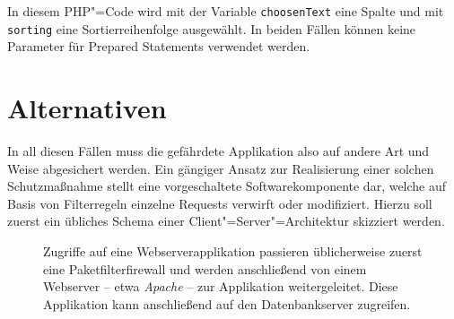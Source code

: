 \begin{listing}[htbp!]
\begin{margincap}
\inputminted[startinline,obeytabs]{php}{imports/weak_features.php}
\caption[Dynamische Auswahl von Spalten und Sortierung]{In diesem PHP"=Code wird mit der Variable \texttt{choosenText} eine Spalte und mit \texttt{sorting} eine Sortierreihenfolge ausgewählt. In beiden Fällen können keine Parameter für Prepared Statements verwendet werden.}
\label{lst:strange_query}
\end{margincap}
\end{listing}



\section{Alternativen}
In all diesen Fällen muss die gefährdete Applikation also auf andere Art und Weise abgesichert werden. Ein gängiger Ansatz zur Realisierung einer solchen Schutzmaßnahme stellt eine vorgeschaltete Softwarekomponente dar, welche auf Basis von Filterregeln einzelne Requests verwirft oder modifiziert. Hierzu soll zuerst ein übliches Schema einer Client"=Server"=Architektur skizziert werden.

\begin{figure}[ht!]
\begin{margincap}
\centering
{}
\caption[Webserverarchitektur]{Zugriffe auf eine Webserverapplikation passieren üblicherweise zuerst eine Paketfilterfirewall und werden anschließend von einem Webserver -- etwa \emph{Apache} -- zur Applikation weitergeleitet. Diese Applikation kann anschließend auf den Datenbankserver zugreifen.}
\label{img:server_arch}
\end{margincap}
\end{figure}

